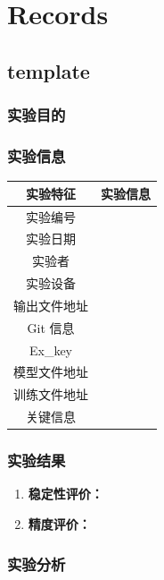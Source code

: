 \section{Records}


\subsection{template}

\subsubsection{实验目的}


\subsubsection{实验信息}


\begin{table}[H]
	\centering
	\begin{spacing}{1.5}
	\begin{tabular}{cc}\hline
		实验特征 & 实验信息 \\
		\hline
		实验编号 & \\
		实验日期 &  \\
		实验者 & \\
		实验设备& \\
		输出文件地址 & \\
		Git 信息 & \\
		Ex\_key & \\
		模型文件地址 & \\
		训练文件地址 & \\
		关键信息 & \\\hline
	\end{tabular}
	\end{spacing}
\end{table}


\subsubsection{实验结果}


\begin{enumerate}[1.]
	\item \textbf{稳定性评价：}
	\item \textbf{精度评价：}
\end{enumerate}


\subsubsection{实验分析}


